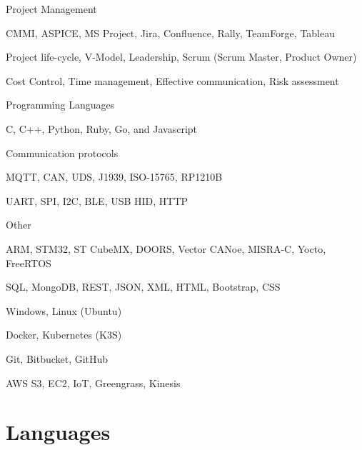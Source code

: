 \documentclass{resume} %
\begin{document}
\skillgroup
    {Project Management}
    {
    \begin{itemize-bullets}
        \item{CMMI, ASPICE, MS Project, Jira, Confluence, Rally, TeamForge, Tableau}
        \item{Project life-cycle, V-Model, Leadership, Scrum (Scrum Master, Product Owner)}
        \item{Cost Control, Time management, Effective communication, Risk assessment}
        \end{itemize-bullets}
    }


\skillgroup
    {Programming Languages}
    {
    \begin{itemize-bullets}
        \item{C, C++, Python, Ruby, Go, and Javascript}
        \end{itemize-bullets}
    }


\skillgroup
    {Communication protocols}
    {
    \begin{itemize-bullets}
        \item{MQTT, CAN, UDS, J1939, ISO-15765, RP1210B}
        \item{UART, SPI, I2C, BLE, USB HID, HTTP}
        \end{itemize-bullets}
    }


\skillgroup
    {Other}
    {
    \begin{itemize-bullets}
        \item{ARM, STM32, ST CubeMX, DOORS, Vector CANoe, MISRA-C, Yocto, FreeRTOS}
        \item{SQL, MongoDB, REST, JSON, XML, HTML, Bootstrap, CSS}
        \item{Windows, Linux (Ubuntu)}
        \item{Docker, Kubernetes (K3S)}
        \item{Git, Bitbucket, GitHub}
        \item{AWS S3, EC2, IoT, Greengrass, Kinesis}
        \end{itemize-bullets}
    }




\section{Languages}
\end{document}
